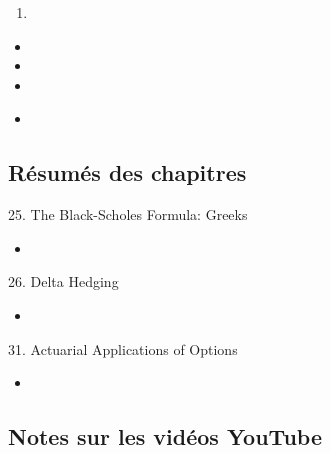 \documentclass[12pt, titlepage, french]{report}
\begin{document}
\begin{outcomes}
\begin{enumerate}
	\item	
\end{enumerate}
\end{outcomes}

\begin{ASM_chapter}
\begin{itemize}
	\item	{}
	\item	{}
	\item	{}
\end{itemize}
\end{ASM_chapter}

\begin{YTB_vids}
\begin{itemize}
	\item	
\end{itemize}
\end{YTB_vids}

\subsection{Résumés des chapitres}

\begin{CHPT_SUMM_AUTO}[label = {L.-25}]{25. The Black-Scholes Formula: Greeks}
	\begin{itemize}
		\item	
	\end{itemize}
\end{CHPT_SUMM_AUTO}

\begin{CHPT_SUMM_AUTO}[label = {L.-26}]{26. Delta Hedging}
	\begin{itemize}
		\item	
	\end{itemize}
\end{CHPT_SUMM_AUTO}

\begin{CHPT_SUMM_AUTO}[label = {L.-31}]{31. Actuarial Applications of Options}
	\begin{itemize}
		\item	
	\end{itemize}
\end{CHPT_SUMM_AUTO}

\subsection{Notes sur les vidéos YouTube}


\newpage
\end{document}
